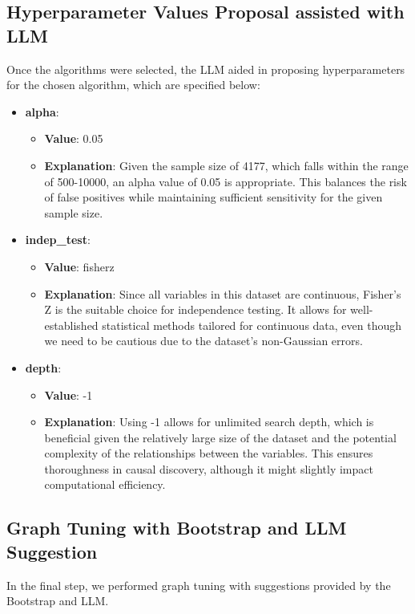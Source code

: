\documentclass{article}
\begin{document}
\subsection{Hyperparameter Values Proposal assisted with LLM}
Once the algorithms were selected, the LLM aided in proposing hyperparameters 
for the chosen algorithm, which are specified below:
        
\begin{itemize}
\item \textbf{alpha}:
    \begin{itemize}
        \item \textbf{Value}: 0.05
        \item \textbf{Explanation}: Given the sample size of 4177, which falls within the range of 500-10000, an alpha value of 0.05 is appropriate. This balances the risk of false positives while maintaining sufficient sensitivity for the given sample size.
    \end{itemize}
                         
\item \textbf{indep\_test}:
    \begin{itemize}
        \item \textbf{Value}: fisherz
        \item \textbf{Explanation}: Since all variables in this dataset are continuous, Fisher's Z is the suitable choice for independence testing. It allows for well-established statistical methods tailored for continuous data, even though we need to be cautious due to the dataset's non-Gaussian errors.
    \end{itemize}
                         
\item \textbf{depth}:
    \begin{itemize}
        \item \textbf{Value}: -1
        \item \textbf{Explanation}: Using -1 allows for unlimited search depth, which is beneficial given the relatively large size of the dataset and the potential complexity of the relationships between the variables. This ensures thoroughness in causal discovery, although it might slightly impact computational efficiency.
    \end{itemize}     
\end{itemize}        

\subsection{Graph Tuning with Bootstrap and LLM Suggestion}
In the final step, we performed graph tuning with suggestions provided by the Bootstrap and LLM.
            
\end{document}
